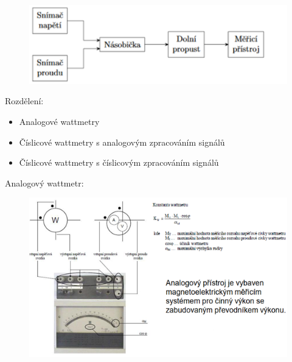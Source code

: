 \begin{figure}[H]
    \includegraphics*[scale  = 1]{images/wattPruchozi.png}
\end{figure}

Rozdělení:
\begin{itemize}
    \item Analogové wattmetry
    \item Číslicové wattmetry s analogovým zpracováním signálů
    \item Číslicové wattmetry s číslicovým zpracováním signálů 
\end{itemize}

Analogový wattmetr:
\begin{figure}[H]
    \includegraphics*[scale  = 1.3]{images/wattAnalog.png}
\end{figure}

